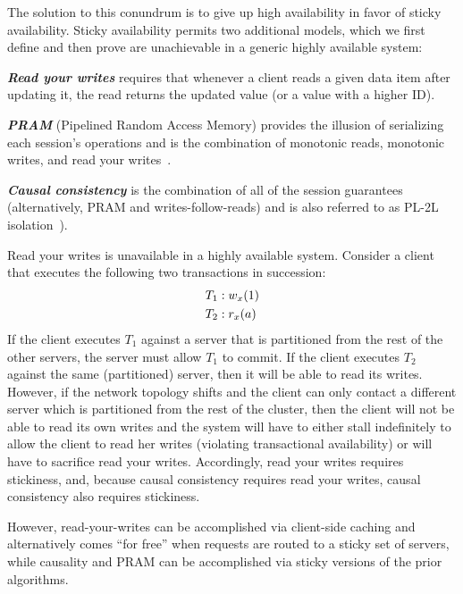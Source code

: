 The solution to this conundrum is to give up high availability in
favor of sticky availability. Sticky availability permits two
additional models, which we first define and then prove are
unachievable in a generic highly available system:

\vspace{.5em}\noindent\textit{\textbf{Read your writes}} requires
that whenever a client reads a given data item after updating it, the
read returns the updated value (or a value with a higher ID).

\vspace{.5em}\noindent\textit{\textbf{PRAM}} (Pipelined Random Access
Memory) provides the illusion of serializing each session's operations
and is the combination of monotonic reads, monotonic writes, and read
your writes~\cite{herlihy-art}.

\vspace{.5em}\noindent\textit{\textbf{Causal consistency}} is the combination of
all of the session guarantees~\cite{sessiontocausal} (alternatively,
PRAM and writes-follow-reads) and is also referred to as PL-2L
isolation~\cite{adya}).\vspace{.5em}

Read your writes is unavailable in a highly available system. Consider
a client that executes the following two transactions in succession:
\vspace{-.5em}
\begin{align*}
\small
T_1 &: w_x(1)
\\T_2 &: r_x(a)
\end{align*}
If the client executes $T_1$ against a server that is partitioned from
the rest of the other servers, the server must allow $T_1$ to
commit. If the client executes $T_2$ against the same (partitioned)
server, then it will be able to read its writes. However, if the
network topology shifts and the client can only contact a different
server which is partitioned from the rest of the cluster, then the
client will not be able to read its own writes and the system will
have to either stall indefinitely to allow the client to read her
writes (violating transactional availability) or will have to
sacrifice read your writes. Accordingly, read your writes requires
stickiness, and, because causal consistency requires read your writes,
causal consistency also requires stickiness.

However, read-your-writes can be accomplished via client-side caching
and alternatively comes ``for free'' when requests are routed to a
sticky set of servers, while causality and PRAM can be accomplished
via sticky versions of the prior algorithms.

